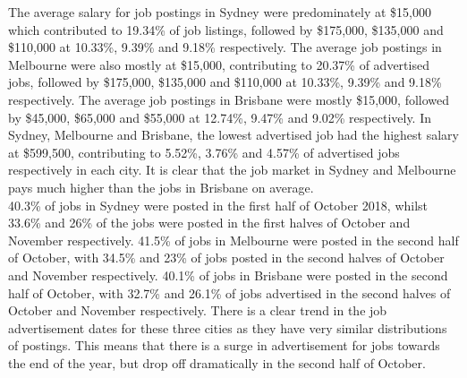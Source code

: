 \documentclass[twoside, 12pt, a4paper]{article}
\begin{document}
The average salary for job postings in Sydney were predominately at \$15,000 which contributed to 19.34\% of job listings, followed by \$175,000, \$135,000 and \$110,000 at 10.33\%, 9.39\% and 9.18\% respectively. The average job postings in Melbourne were also mostly at \$15,000, contributing to 20.37\% of advertised jobs, followed by \$175,000, \$135,000 and \$110,000 at 10.33\%, 9.39\% and 9.18\% respectively. The average job postings in Brisbane were mostly \$15,000, followed by \$45,000, \$65,000 and \$55,000 at 12.74\%, 9.47\% and 9.02\% respectively. In Sydney, Melbourne and Brisbane, the lowest advertised job had the highest salary at \$599,500, contributing to 5.52\%, 3.76\% and 4.57\% of advertised jobs respectively in each city. It is clear that the job market in Sydney and Melbourne pays much higher than the jobs in Brisbane on average.\\ 
40.3\% of jobs in Sydney were posted in the first half of October 2018, whilst 33.6\% and 26\% of the jobs were posted in the first halves of October and November respectively. 41.5\% of jobs in Melbourne were posted in the second half of October, with 34.5\% and 23\% of jobs posted in the second halves of October and November respectively. 40.1\% of jobs in Brisbane were posted in the second half of October, with 32.7\% and 26.1\% of jobs advertised in the second halves of October and November respectively. There is a clear trend in the job advertisement dates for these three cities as they have very similar distributions of postings. This means that there is a surge in advertisement for jobs towards the end of the year, but drop off dramatically in the second half of October.\\
\end{document}
